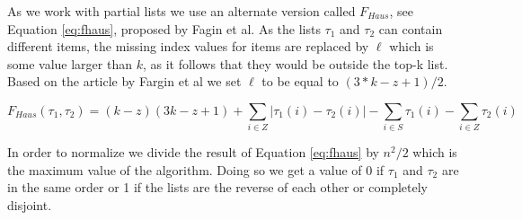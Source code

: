 As we work with partial lists we use an alternate version called $F_{Haus}$, see Equation \ref{eq:fhaus}, proposed by Fagin et al\citep{comparing:topk}.
As the lists $\tau_1$ and $\tau_2$ can contain different items, the missing index values for items are replaced by $\ell$ which is some value larger than $k$, as it follows that they would be outside the top-k list. Based on the article by Fargin et al we set $\ell$ to be equal to $(3 * k - z + 1)/2$.

\footnotesize
\begin{equation}\label{eq:fhaus}
F_{Haus}(\tau_1,\tau_2)= (k-z)(3k-z+1)+\sum_{i\in Z} | \tau_1 (i) - \tau_2 (i) | - \sum_{i\in S} \tau_1 (i) - \sum_{i\in Z} \tau_2(i)
\end{equation}
\normalsize

In order to normalize we divide the result of Equation \ref{eq:fhaus} by $n^2 /2$ which is the maximum value of the algorithm. Doing so we get a value of 0 if $\tau_1$ and $\tau_2$ are in the same order or 1 if the lists are the reverse of each other or completely disjoint.
